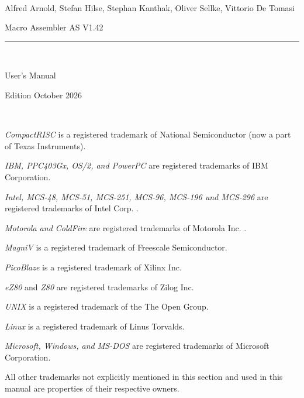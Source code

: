 \documentclass[12pt,twoside]{report}
\newcommand{\asname}{{AS}}
\begin{document}
\thispagestyle{empty}

\
\vspace{7cm}\par

\begin{raggedright}
{\large Alfred Arnold, Stefan Hilse, Stephan Kanthak, Oliver
 Sellke, Vittorio De Tomasi}
\vspace{1cm}\par
{\huge Macro Assembler \asname{} V1.42}\\
\rule{9.5cm}{0.3mm}\\
\vspace{2mm}\par
{\huge User's Manual}

\vspace{1cm}\par

{\large Edition October 2026}
\end{raggedright}

\clearpage
\thispagestyle{empty}

\ \vspace{5cm}

{\em CompactRISC} is a registered trademark of National
 Semiconductor (now a part of Texas Instruments).

{\em IBM, PPC403Gx, OS/2, and PowerPC} are registered trademarks of IBM
Corporation.

{\em Intel, MCS-48, MCS-51, MCS-251, MCS-96, MCS-196 und MCS-296} are
registered trademarks of Intel Corp. .

{\em Motorola and ColdFire} are registered trademarks of Motorola Inc. .

{\em MagniV} is a registered trademark of Freescale Semiconductor.

{\em PicoBlaze} is a registered trademark of Xilinx Inc.

{\em eZ80} and {\em Z80} are registered trademarks of Zilog Inc. 

{\em UNIX} is a registered trademark of the The Open Group.

{\em Linux} is a registered trademark of Linus Torvalds.

{\em Microsoft, Windows, and MS-DOS} are registered trademarks of
Microsoft Corporation.

All other trademarks not explicitly mentioned in this section and used in
this manual are properties of their respective owners.

\vspace{5cm}
\end{document}
